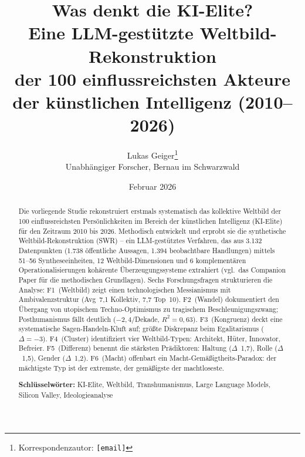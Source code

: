 \documentclass[12pt,a4paper]{article}
\title{%
  \sffamily\bfseries
  Was denkt die KI-Elite?\\[0.3em]
  \large Eine LLM-gest\"utzte Weltbild-Rekonstruktion\\
  der 100 einflussreichsten Akteure der k\"unstlichen Intelligenz (2010--2026)%
}
\author{%
  Lukas Geiger\thanks{Korrespondenzautor: \texttt{[email]}}\\[0.3em]
  \small Unabh\"angiger Forscher, Bernau im Schwarzwald
}
\date{Februar 2026}
\begin{document}


\maketitle
\thispagestyle{empty}

\begin{abstract}
\noindent
Die vorliegende Studie rekonstruiert erstmals systematisch das kollektive Weltbild der 100 einflussreichsten Pers\"onlichkeiten im Bereich der k\"unstlichen Intelligenz (KI-Elite) f\"ur den Zeitraum 2010 bis 2026. Methodisch entwickelt und erprobt sie die synthetische Weltbild-Rekonstruktion (SWR) -- ein LLM-gest\"utztes Verfahren, das aus 3.132 Datenpunkten (1.738 \"offentliche Aussagen, 1.394 beobachtbare Handlungen) mittels 51--56 Syntheseeinheiten, 12 Weltbild-Dimensionen und 6 komplement\"aren Operationalisierungen koh\"arente \"Uberzeugungssysteme extrahiert (vgl.\ das Companion Paper \citealt{Geiger2026SWR} f\"ur die methodischen Grundlagen). Sechs Forschungsfragen strukturieren die Analyse: F1~(Weltbild) zeigt einen \glqq technologischen Messianismus mit Ambivalenzstruktur\grqq{} (Avg~7,1 Kollektiv, 7,7 Top~10). F2~(Wandel) dokumentiert den \"Ubergang von utopischem Techno-Optimismus zu tragischem Beschleunigungszwang; Posthumanismus f\"allt deutlich ($-2{,}4$/Dekade, $R^2 = 0{,}63$). F3~(Kongruenz) deckt eine systematische Sagen-Handeln-Kluft auf; gr\"o\ss{}te Diskrepanz beim Egalitarismus ($\Delta = -3$). F4~(Cluster) identifiziert vier Weltbild-Typen: Architekt, H\"uter, Innovator, Befreier. F5~(Differenz) benennt die st\"arksten Pr\"adiktoren: Haltung ($\Delta$~1,7), Rolle ($\Delta$~1,5), Gender ($\Delta$~1,2). F6~(Macht) offenbart ein Macht-Gem\"a\ss{}igtheits-Paradox: der m\"achtigste Typ ist der extremste, der gem\"a\ss{}igste der machtloseste.

\medskip
\noindent\textbf{Schl\"usselw\"orter:} KI-Elite, Weltbild, Transhumanismus, Large Language Models, Silicon Valley, Ideologieanalyse
\end{abstract}

\newpage
\setcounter{page}{1}

\end{document}
